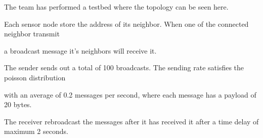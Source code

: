 \tiny

The team has performed a testbed where the topology can be seen here.

Each sensor node store the address of its neighbor. When one of the connected neighbor transmit

a broadcast message it's neighbors will receive it.

The sender sends out a total of 100 broadcasts. The sending rate satisfies the poisson distribution

with an average of 0.2 messages per second, where each message has a payload of 20 bytes.

The receiver rebroadcast the messages after it has received it after a time delay of maximum 2 seconds.